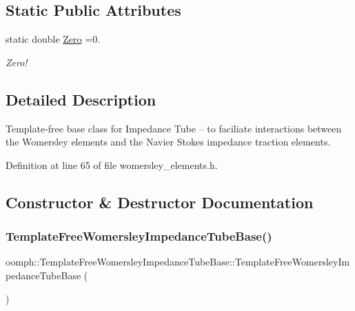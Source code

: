 \subsection*{Static Public Attributes}
\begin{DoxyCompactItemize}
\item 
static double \hyperlink{classoomph_1_1TemplateFreeWomersleyImpedanceTubeBase_a37b438da1f862ccadbdb80cf8258a781}{Zero} =0.
\begin{DoxyCompactList}\small\item\em Zero! \end{DoxyCompactList}\end{DoxyCompactItemize}


\subsection{Detailed Description}
Template-\/free base class for Impedance Tube -- to faciliate interactions between the Womersley elements and the Navier Stokes impedance traction elements. 

Definition at line 65 of file womersley\+\_\+elements.\+h.



\subsection{Constructor \& Destructor Documentation}
\mbox{\label{classoomph_1_1TemplateFreeWomersleyImpedanceTubeBase_a52044dbd661e704066760426547fc3e8}} 
\subsubsection{\texorpdfstring{Template\+Free\+Womersley\+Impedance\+Tube\+Base()}{TemplateFreeWomersleyImpedanceTubeBase()}}
{\footnotesize\ttfamily oomph\+::\+Template\+Free\+Womersley\+Impedance\+Tube\+Base\+::\+Template\+Free\+Womersley\+Impedance\+Tube\+Base (\begin{DoxyParamCaption}{ }\end{DoxyParamCaption})\hspace{0.3cm}{\ttfamily [inline]}}



